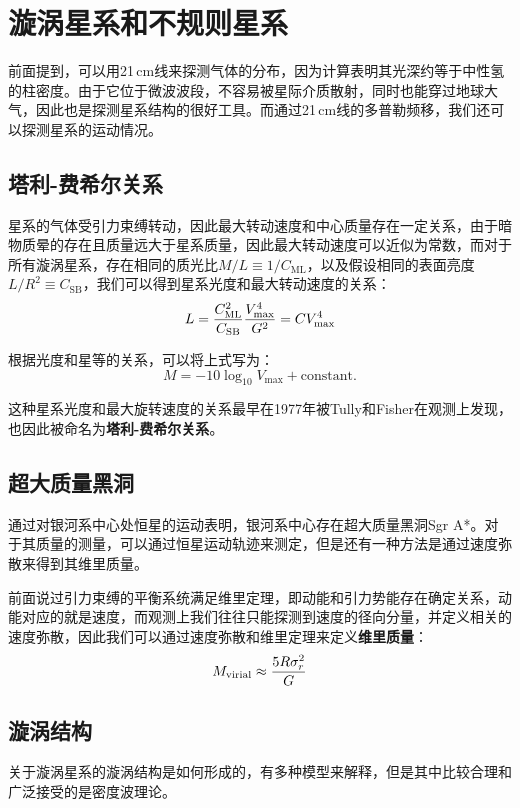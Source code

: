 \documentclass[openany]{ctexbook}
\begin{document}
\section{漩涡星系和不规则星系}
前面提到，可以用21\,cm线来探测气体的分布，因为计算表明其光深约等于中性氢的柱密度。由于它位于微波波段，不容易被星际介质散射，同时也能穿过地球大气，因此也是探测星系结构的很好工具。而通过21\,cm线的多普勒频移，我们还可以探测星系的运动情况。

\subsection{塔利-费希尔关系}
星系的气体受引力束缚转动，因此最大转动速度和中心质量存在一定关系，由于暗物质晕的存在且质量远大于星系质量，因此最大转动速度可以近似为常数，而对于所有漩涡星系，存在相同的质光比$M/L\equiv 1/C_\mathrm{ML}$，以及假设相同的表面亮度$L/R^2\equiv C_\mathrm{SB}$，我们可以得到星系光度和最大转动速度的关系：
\begin{equation}
  L={C_\mathrm{ML}^2\over C_\mathrm{SB}}{V_\mathrm{max}^4\over G^2}=CV_\mathrm{max}^4
\end{equation}

根据光度和星等的关系，可以将上式写为：
\begin{equation}
  M=-10\log_{10}V_\mathrm{max}+\mathrm{constant.}
\end{equation}

这种星系光度和最大旋转速度的关系最早在1977年被Tully和Fisher在观测上发现，也因此被命名为\textbf{塔利-费希尔关系}。

\subsection{超大质量黑洞}
通过对银河系中心处恒星的运动表明，银河系中心存在超大质量黑洞Sgr A*。对于其质量的测量，可以通过恒星运动轨迹来测定，但是还有一种方法是通过速度弥散来得到其维里质量。

前面说过引力束缚的平衡系统满足维里定理，即动能和引力势能存在确定关系，动能对应的就是速度，而观测上我们往往只能探测到速度的径向分量，并定义相关的速度弥散，因此我们可以通过速度弥散和维里定理来定义\textbf{维里质量}：
\begin{equation}
  M_\mathrm{virial}\approx{5R\sigma_r^2\over G}
\end{equation}

\subsection{漩涡结构}
关于漩涡星系的漩涡结构是如何形成的，有多种模型来解释，但是其中比较合理和广泛接受的是密度波理论。
\end{document}
